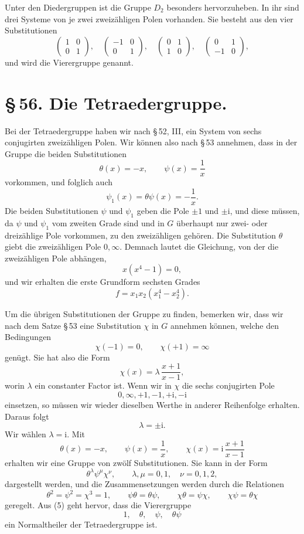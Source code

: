 \documentclass[11pt]{article}
\providecommand{\ii}{\mathrm{i}}
\providecommand{\mat}[4]{\begin{pmatrix}#1&#2\\#3&#4\end{pmatrix}}
\providecommand{\mat}[4]{\begin{pmatrix}#1&#2\\#3&#4\end{pmatrix}}
\begin{document}
Unter den Diedergruppen ist die Gruppe $D_2$ besonders hervorzuheben. In ihr sind drei Systeme von je zwei zweizähligen Polen vorhanden. Sie besteht aus den vier Substitutionen
\begin{equation}
 \mat{1}{0}{0}{1},\quad
 \mat{-1}{0}{0}{1},\quad
 \mat{0}{1}{1}{0},\quad
 \mat{0}{1}{-1}{0},
\tag{7}
\end{equation}
und wird die Vierergruppe genannt.

\section*{\S\,56. Die Tetraedergruppe.}

Bei der Tetraedergruppe haben wir nach \S\,52, III, ein System von sechs conjugirten zweizähligen Polen. Wir können also nach \S\,53 annehmen, dass in der Gruppe die beiden Substitutionen
\begin{equation}
 \theta(x)=-x,\qquad \psi(x)=\frac1x
\tag{1}
\end{equation}
vorkommen, und folglich auch
\[
 \psi_1(x)=\theta\psi(x)=-\frac1x .
\]
Die beiden Substitutionen $\psi$ und $\psi_1$ geben die Pole $\pm1$ und $\pm\ii$, und diese müssen, da $\psi$ und $\psi_1$ vom zweiten Grade sind und in $G$ überhaupt nur zwei- oder dreizählige Pole vorkommen, zu den zweizähligen gehören. Die Substitution $\theta$ giebt die zweizähligen Pole $0,\infty$. Demnach lautet die Gleichung, von der die zweizähligen Pole abhängen,
\[
 x(x^4-1)=0,
\]
und wir erhalten die erste Grundform sechsten Grades
\begin{equation}
 f=x_1x_2(x_1^4-x_2^4).
\tag{2}
\end{equation}

Um die übrigen Substitutionen der Gruppe zu finden, bemerken wir, dass wir nach dem Satze \S\,53 eine Substitution $\chi$ in $G$ annehmen können, welche den Bedingungen
\[
 \chi(-1)=0,\qquad \chi(+1)=\infty
\]
genügt. Sie hat also die Form
\begin{equation}
 \chi(x)=\lambda\,\frac{x+1}{x-1},
\tag{3}
\end{equation}
worin $\lambda$ ein constanter Factor ist. Wenn wir in $\chi$ die sechs conjugirten Pole
\[
0,\infty,+1,-1,+\ii,-\ii
\]
einsetzen, so müssen wir wieder dieselben Werthe in anderer Reihenfolge erhalten. Daraus folgt
\[
 \lambda=\pm\ii .
\]
Wir wählen $\lambda=\ii$. Mit
\[
 \theta(x)=-x,\qquad \psi(x)=\frac1x,\qquad
 \chi(x)=\ii\,\frac{x+1}{x-1}
\]
erhalten wir eine Gruppe von zwölf Substitutionen. Sie kann in der Form
\begin{equation}
 \theta^\lambda\psi^\mu\chi^\nu,\qquad
 \lambda,\mu=0,1,\quad \nu=0,1,2,
\tag{4}
\end{equation}
dargestellt werden, und die Zusammensetzungen werden durch die Relationen
\begin{equation}
 \theta^2=\psi^2=\chi^3=1,\qquad
 \psi\theta=\theta\psi,\qquad
 \chi\theta=\psi\chi,\qquad
 \chi\psi=\theta\chi
\tag{5}
\end{equation}
geregelt. Aus (5) geht hervor, dass die Vierergruppe
\begin{equation}
 1,\quad \theta,\quad \psi,\quad \theta\psi
\tag{6}
\end{equation}
ein Normaltheiler der Tetraedergruppe ist.
\end{document}
